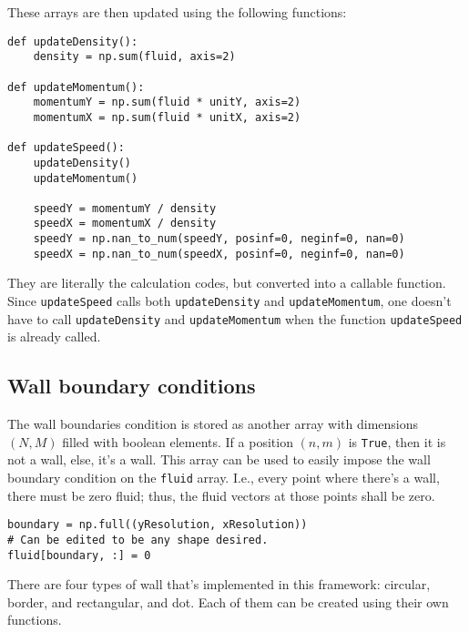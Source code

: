 These arrays are then updated using the following functions:
\begin{verbatim}
def updateDensity():
    density = np.sum(fluid, axis=2)

def updateMomentum():
    momentumY = np.sum(fluid * unitY, axis=2)
    momentumX = np.sum(fluid * unitX, axis=2)

def updateSpeed():
    updateDensity()
    updateMomentum()

    speedY = momentumY / density
    speedX = momentumX / density
    speedY = np.nan_to_num(speedY, posinf=0, neginf=0, nan=0)
    speedX = np.nan_to_num(speedX, posinf=0, neginf=0, nan=0)
\end{verbatim}
They are literally the calculation codes, but converted into a callable function.   Since \texttt{updateSpeed} calls both \texttt{updateDensity} and \texttt{updateMomentum}, one doesn't have to call \texttt{updateDensity} and \texttt{updateMomentum} when the function \texttt{updateSpeed} is already called.

\subsection{Wall boundary conditions}

The wall boundaries condition is stored as another array with dimensions $(N, M)$ filled with boolean elements. If a position $(n, m)$ is \texttt{True}, then it is not a wall, else, it's a wall. This array can be used to easily impose the wall boundary condition on the \texttt{fluid} array. I.e., every point where there's a wall, there must be zero fluid; thus, the fluid vectors at those points shall be zero.
\begin{verbatim}
boundary = np.full((yResolution, xResolution))
# Can be edited to be any shape desired.
fluid[boundary, :] = 0
\end{verbatim}

There are four types of wall that's implemented in this framework: circular, border, and rectangular, and dot. Each of them can be created using their own functions.

